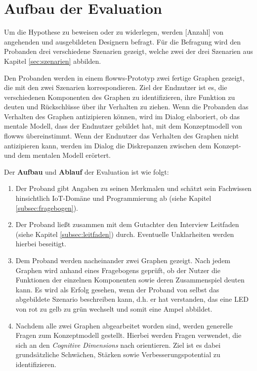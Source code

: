 \section{Aufbau der Evaluation}
Um die Hypothese zu beweisen oder zu widerlegen, werden [Anzahl] von angehenden und ausgebildeten Designern befragt. Für die Befragung wird den Probanden drei verschiedene Szenarien gezeigt, welche zwei der drei Szenarien aus Kapitel \ref{sec:szenarien} abbilden.

Den Probanden werden in einem flowws-Prototyp zwei fertige Graphen gezeigt, die mit den zwei Szenarien korrespondieren. Ziel der Endnutzer ist es, die verschiedenen Komponenten des Graphen zu identifizieren, ihre Funktion zu deuten und Rückschlüsse über ihr Verhalten zu ziehen. Wenn die Probanden das Verhalten des Graphen antizipieren können, wird im Dialog elaboriert, ob das mentale Modell, dass der Endnutzer gebildet hat, mit dem Konzeptmodell von flowws übereinstimmt. Wenn der Endnutzer das Verhalten des Graphen nicht antizipieren kann, werden im Dialog die Diskrepanzen zwischen dem Konzept- und dem mentalen Modell erörtert.

Der \textbf{Aufbau} und \textbf{Ablauf} der Evaluation ist wie folgt:
\begin{enumerate}
    \item Der Proband gibt Angaben zu seinen Merkmalen und schätzt sein Fachwissen hinsichtlich \ac{IoT}-Domäne und Programmierung ab (siehe Kapitel \ref{subsec:fragebogen}).
    \item Der Proband ließt zusammen mit dem Gutachter den Interview Leitfaden (siehe Kapitel \ref{subsec:leitfaden}) durch. Eventuelle Unklarheiten werden hierbei beseitigt. 
    \item Dem Proband werden nacheinander zwei Graphen gezeigt. Nach jedem Graphen wird anhand eines Fragebogens geprüft, ob der Nutzer die Funktionen der einzelnen Komponenten sowie deren Zusammenspiel deuten kann. Es wird als Erfolg gesehen, wenn der Proband von selbst das abgebildete Szenario beschreiben kann, d.h. er hat verstanden, das eine LED von rot zu gelb zu grün wechselt und somit eine Ampel abbildet. 
    \item Nachdem alle zwei Graphen abgearbeitet worden sind, werden generelle Fragen zum Konzeptmodell gestellt. Hierbei werden Fragen verwendet, die sich an den \textit{Cognitive Dimensions} nach \cite{blackwell2000cognitive} orientieren. Ziel ist es dabei grundsätzliche Schwächen, Stärken sowie Verbesserungspotential zu identifizieren.
\end{enumerate}

